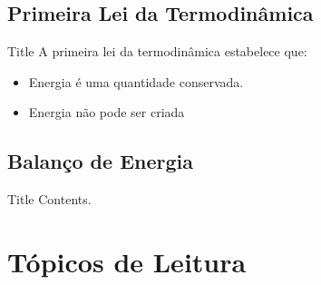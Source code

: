 \subsection{Primeira Lei da Termodinâmica}

    \begin{frame}{Title}\vspace*{-2em}
        A \alert{primeira lei da termodinâmica} estabelece que:
        \begin{itemize}
            \item<1-> \alert{Energia} é uma quantidade \alert{conservada}.
            \item<2-> \alert{Energia} não pode ser \alert{criada}
        \end{itemize}
    \end{frame}

\subsection{Balanço de Energia}

    \begin{frame}{Title}\vspace*{-2em}
        Contents.
    \end{frame}

\section{Tópicos de Leitura}

